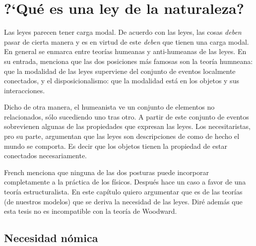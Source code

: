 
\chapter{?`Qué es una ley de la naturaleza?}

\noindent Las leyes parecen tener carga modal. De acuerdo con las leyes, las cosas \emph{deben} pasar de cierta manera y es en virtud de este \emph{deben} que tienen una carga modal. En general se enmarca entre teorías humeanas y anti-humeanas de las leyes. En su entrada, \cite{French2021} menciona que las dos posiciones más famosas son la teoría humneana: que la modalidad de las leyes superviene del conjunto de eventos localmente conectados, y el disposicionalismo: que la modalidad está en los objetos y sus interacciones.

Dicho de otra manera, el humeanista ve un conjunto de elementos no relacionados, sólo sucediendo uno tras otro. A partir de este conjunto de eventos sobrevienen algunas de las propiedades que expresan las leyes. Los necesitaristas, pro su parte, argumentan que las leyes son descripciones de como de hecho el mundo se comporta. Es decir que los objetos tienen la propiedad de estar conectados necesariamente.

French menciona que ninguna de las dos posturas puede incorporar completamente a la práctica de los físicos. Después hace un caso a favor de una teoría estructuralista. En este capítulo quiero argumentar que es de las teorías (de nuestros modelos) que se deriva la necesidad de las leyes. Diré además que esta tesis no es incompatible con la teoría de Woodward.




\section{Necesidad nómica}

